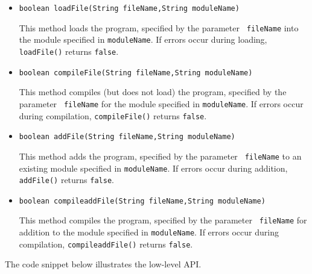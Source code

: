 \begin{itemize}
\item
\begin{verbatim}
boolean loadFile(String fileName,String moduleName)
\end{verbatim}
  This method loads the \FLSYSTEM program, specified by the parameter {\tt
    fileName} into the \FLSYSTEM module specified in {\tt moduleName}.
  If errors occur during loading, \texttt{loadFile()} returns \texttt{false}.  
\item
\begin{verbatim}
boolean compileFile(String fileName,String moduleName)
\end{verbatim}
  This method compiles (but does not load)
  the \FLSYSTEM program, specified by the parameter {\tt
    fileName} for the \FLSYSTEM module specified in {\tt moduleName}.
  If errors occur during compilation, \texttt{compileFile()} returns \texttt{false}.  
\item
\begin{verbatim}
boolean addFile(String fileName,String moduleName)
\end{verbatim}
  This method adds the \FLSYSTEM program, specified by the parameter {\tt
    fileName} to an existing \FLSYSTEM module specified in {\tt moduleName}.
  If errors occur during addition, \texttt{addFile()} returns \texttt{false}.  
\item
\begin{verbatim}
boolean compileaddFile(String fileName,String moduleName)
\end{verbatim}
  This method compiles the \FLSYSTEM program, specified by the parameter {\tt
    fileName} for addition to the \FLSYSTEM module specified in {\tt moduleName}.
  If errors occur during compilation, \texttt{compileaddFile()} returns \texttt{false}.  
\end{itemize}

The code snippet below illustrates the low-level API.

